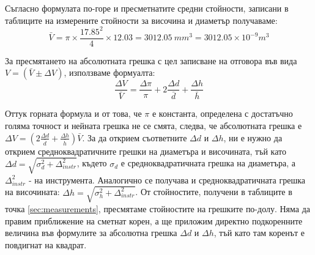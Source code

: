 \documentclass[12pt]{article}
\begin{document}
Съгласно формулата по-горе и пресметнатите средни стойности, записани в таблиците на измерените стойности за височина и диаметър получаваме:
\begin{equation}
    \bar{V} = \pi \times \frac{17.85^2}{4} \times 12.03 = 
    \SI{3012.05}{mm^3} = 3012.05 \times 10^{-9} m^3
\end{equation}

За пресмятането на абсолютната грешка с цел записване на отговора във вида \begin{math} V = (\bar{V} \pm \Delta V) \end{math}, използваме формуалта:
\begin{equation}
    \frac{\Delta V}{\bar{V}} = \frac{\Delta \pi}{\pi} + 2\frac{\Delta d}{\bar{d}} + \frac{\Delta h}{\bar{h}}
\end{equation}

Оттук горната формула и от това, че \begin{math} \pi \end{math} е константа, определена с достатъчно голяма точност и нейната грешка не се смята, следва, че абсолютната грешка е \begin{math} \Delta V = (2\frac{\Delta d}{\bar{d}} + \frac{\Delta h}{\bar{h}})\bar{V}\end{math}. За да открием съответните \begin{math}
\Delta d  \end{math} и \begin{math} \Delta h \end{math}, ни е нужно да открием средноквадратичните грешки на диаметъра и височината, тъй като \begin{math} \Delta d = \sqrt{\sigma_d^2 + \Delta_{instr}^2}\end{math}, където \begin{math} \sigma_d \end{math} е средноквадратичната грешка на диаметъра, а \begin{math} \Delta_{instr}^2\end{math} - на инструмента. Аналогично се получава и средноквадратичната грешка на височината: \begin{math} \Delta h = \sqrt{\sigma_h^2 + \Delta_{instr}^2}\end{math}. От стойностите, получени в таблиците в точка \ref{sec:measurements}, пресмятаме стойностите на грешките по-долу. Няма да правим приближение на сметнат корен, а ще приложим директно подкоренните величина във формулите за абсолютна грешка \begin{math}\Delta d \end{math} и \begin{math}\Delta h \end{math}, тъй като там коренът е повдигнат на квадрат.
\end{document}
